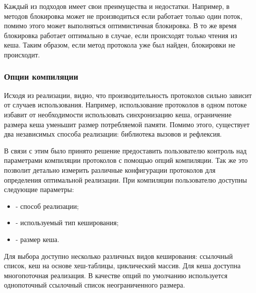 Каждый из подходов имеет свои преимущества и недостатки. Например, в  методов блокировка может не производиться если работает только один поток, помимо этого может выполняться оптимистичная блокировка. В то же время  блокировка работает оптимально в случае, если происходят только чтения из кеша. Таким образом, если метод протокола уже был найден, блокировки не происходит.

\subsubsection{Опции компиляции}

Исходя из реализации, видно, что производительность протоколов сильно зависит от случаев использования. Например, использование протоколов в одном потоке избавит от необходимости использовать синхронизацию кеша, ограничение размера кеша уменьшит размер потребляемой памяти. Помимо этого, существует два независимых способа реализации: библиотека вызовов и рефлексия.

В связи с этим было принято решение предоставить пользователю контроль над параметрами компиляции протоколов с помощью опций компиляции. Так же это позволит детально измерить различные конфигурации протоколов для определения оптимальной реализации. При компиляции пользователю доступны следующие параметры:
\begin{itemize}
  \item {} - способ реализации;
  \item {} - используемый тип кеширования;
  \item {} - размер кеша.
\end{itemize}

Для выбора доступно несколько различных видов кеширования: ссылочный список,  кеш\cite{Johnson:1994:LOH:645920.672996} на основе хеш-таблицы, циклический массив. Для кеша доступна многопоточная реализация. В качестве опций по умолчанию используется однопоточный ссылочный список неограниченного размера.
